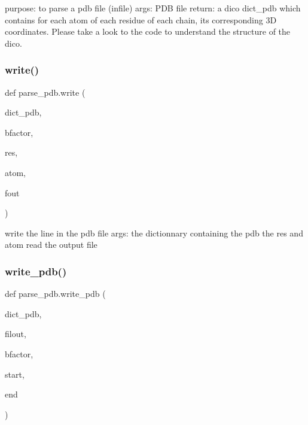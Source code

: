 \begin{DoxyVerb}purpose: to parse a pdb file (infile)
    args:
        PDB file
    return:
        a dico dict_pdb which contains for each atom of each residue of
    each chain, its corresponding 3D coordinates. Please take a look to
    the code to understand the structure of the dico.
\end{DoxyVerb}
 \mbox{\label{namespaceparse__pdb_a21aa74876de3205653041f1e3c890510}} 
\subsubsection{\texorpdfstring{write()}{write()}}
{\footnotesize\ttfamily def parse\+\_\+pdb.\+write (\begin{DoxyParamCaption}\item[{}]{dict\+\_\+pdb,  }\item[{}]{bfactor,  }\item[{}]{res,  }\item[{}]{atom,  }\item[{}]{fout }\end{DoxyParamCaption})}

\begin{DoxyVerb}write the line in the pdb file
args:
    the dictionnary containing the pdb
    the res and atom read
    the output file
\end{DoxyVerb}
 \mbox{\label{namespaceparse__pdb_acab12153cf1cb7438173490b935d3ef8}} 
\subsubsection{\texorpdfstring{write\+\_\+pdb()}{write\_pdb()}}
{\footnotesize\ttfamily def parse\+\_\+pdb.\+write\+\_\+pdb (\begin{DoxyParamCaption}\item[{}]{dict\+\_\+pdb,  }\item[{}]{filout,  }\item[{}]{bfactor,  }\item[{}]{start,  }\item[{}]{end }\end{DoxyParamCaption})}

